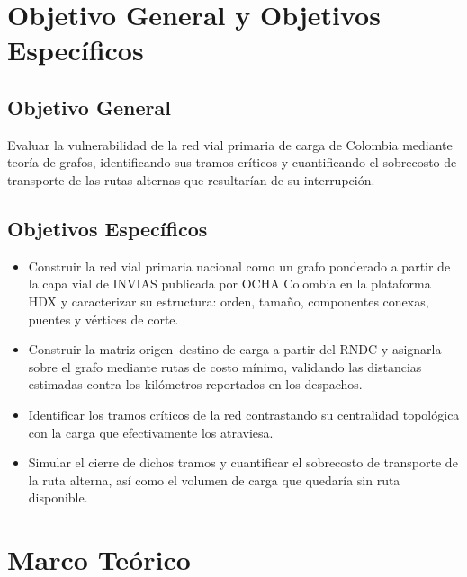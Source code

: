 \documentclass[conference]{IEEEtran}
\begin{document}
\section{Objetivo General y Objetivos Específicos}
\label{sec:objetivos}
\subsection{Objetivo General}
Evaluar la vulnerabilidad de la red vial primaria de carga de Colombia mediante
teoría de grafos, identificando sus tramos críticos y cuantificando el
sobrecosto de transporte de las rutas alternas que resultarían de su
interrupción.

\subsection{Objetivos Específicos}
\begin{itemize}
    \item Construir la red vial primaria nacional como un grafo ponderado a
    partir de la capa vial de INVIAS publicada por OCHA Colombia en la
    plataforma HDX \cite{ocha_hdx_roads} y caracterizar su estructura:
    orden, tamaño, componentes conexas, puentes y vértices de corte.

    \item Construir la matriz origen--destino de carga a partir del RNDC y
    asignarla sobre el grafo mediante rutas de costo mínimo, validando las
    distancias estimadas contra los kilómetros reportados en los despachos.

    \item Identificar los tramos críticos de la red contrastando su
    centralidad topológica con la carga que efectivamente los atraviesa.

    \item Simular el cierre de dichos tramos y cuantificar el sobrecosto de
    transporte de la ruta alterna, así como el volumen de carga que quedaría sin
    ruta disponible.
\end{itemize}

\section{Marco Teórico}
\label{sec:marco}
\end{document}
